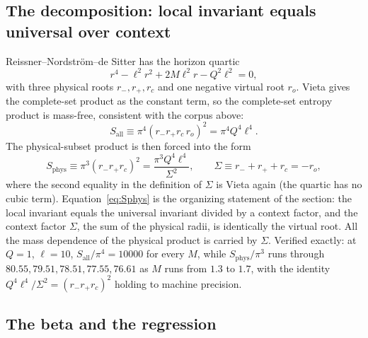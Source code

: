 \subsection{The decomposition: local invariant equals universal over context}

Reissner--Nordstr\"om--de Sitter has the horizon quartic
\begin{equation}
r^4 - \ell^2 r^2 + 2M\ell^2 r - Q^2\ell^2 = 0,
\label{eq:rnds-quartic}
\end{equation}
with three physical roots $r_-, r_+, r_c$ and one negative virtual root $r_o$. Vieta gives the complete-set product as the constant term, so the complete-set entropy product is mass-free, consistent with the corpus above:
\begin{equation}
S_{\mathrm{all}} \equiv \pi^4 (r_- r_+ r_c\, r_o)^2 = \pi^4 Q^4 \ell^4.
\label{eq:Sall}
\end{equation}
The physical-subset product is then forced into the form
\begin{equation}
S_{\mathrm{phys}} \equiv \pi^3 (r_- r_+ r_c)^2 = \frac{\pi^3 Q^4 \ell^4}{\Sigma^2},
\qquad \Sigma \equiv r_- + r_+ + r_c = -r_o,
\label{eq:Sphys}
\end{equation}
where the second equality in the definition of $\Sigma$ is Vieta again (the quartic has no cubic term). Equation~\eqref{eq:Sphys} is the organizing statement of the section: the local invariant equals the universal invariant divided by a context factor, and the context factor $\Sigma$, the sum of the physical radii, is identically the virtual root. All the mass dependence of the physical product is carried by $\Sigma$. Verified exactly: at $Q=1$, $\ell=10$, $S_{\mathrm{all}}/\pi^4 = 10000$ for every $M$, while $S_{\mathrm{phys}}/\pi^3$ runs through $80.55, 79.51, 78.51, 77.55, 76.61$ as $M$ runs from $1.3$ to $1.7$, with the identity $Q^4\ell^4/\Sigma^2 = (r_-r_+r_c)^2$ holding to machine precision.


\subsection{The beta and the regression}

